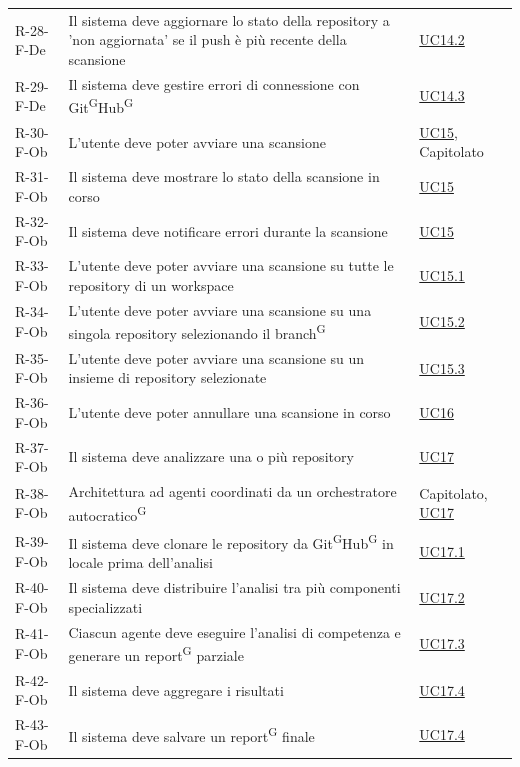 \documentclass[a4paper, 11pt]{article}
\begin{document}
\begin{longtable}[c]{ >{\centering\arraybackslash}m{2.5cm} >{\centering\arraybackslash}m{8.3cm} >{\centering\arraybackslash}m{3.5cm} }
    R-28-F-De & Il sistema deve aggiornare lo stato della repository a 'non aggiornata' se il push è più recente della scansione & \hyperref[UC14.2]{UC14.2} \\
    R-29-F-De & Il sistema deve gestire errori di connessione con Git\textsuperscript{G}Hub\textsuperscript{G} & \hyperref[UC14.3]{UC14.3} \\
    R-30-F-Ob & L'utente deve poter avviare una scansione & \hyperref[UC15]{UC15}, Capitolato \\
    R-31-F-Ob & Il sistema deve mostrare lo stato della scansione in corso & \hyperref[UC15]{UC15} \\
    R-32-F-Ob & Il sistema deve notificare errori durante la scansione & \hyperref[UC15]{UC15} \\
    R-33-F-Ob & L'utente deve poter avviare una scansione su tutte le repository di un workspace & \hyperref[UC15.1]{UC15.1} \\
    R-34-F-Ob & L'utente deve poter avviare una scansione su una singola repository selezionando il branch\textsuperscript{G} & \hyperref[UC15.2]{UC15.2} \\
    R-35-F-Ob & L'utente deve poter avviare una scansione su un insieme di repository selezionate & \hyperref[UC15.3]{UC15.3} \\
    R-36-F-Ob & L'utente deve poter annullare una scansione in corso & \hyperref[UC16]{UC16} \\
    R-37-F-Ob & Il sistema deve analizzare una o più repository & \hyperref[UC17]{UC17} \\
    R-38-F-Ob & Architettura ad agenti coordinati da un orchestratore autocratico\textsuperscript{G} & Capitolato, \hyperref[UC17]{UC17} \\
    R-39-F-Ob & Il sistema deve clonare le repository da Git\textsuperscript{G}Hub\textsuperscript{G} in locale prima dell'analisi & \hyperref[UC17.1]{UC17.1} \\
    R-40-F-Ob & Il sistema deve distribuire l'analisi tra più componenti specializzati & \hyperref[UC17.2]{UC17.2} \\
    R-41-F-Ob & Ciascun agente deve eseguire l'analisi di competenza e generare un report\textsuperscript{G} parziale & \hyperref[UC17.3]{UC17.3} \\
    R-42-F-Ob & Il sistema deve aggregare i risultati & \hyperref[UC17.4]{UC17.4} \\
    R-43-F-Ob & Il sistema deve salvare un report\textsuperscript{G} finale & \hyperref[UC17.4]{UC17.4} \\

\end{longtable}
\end{document}
